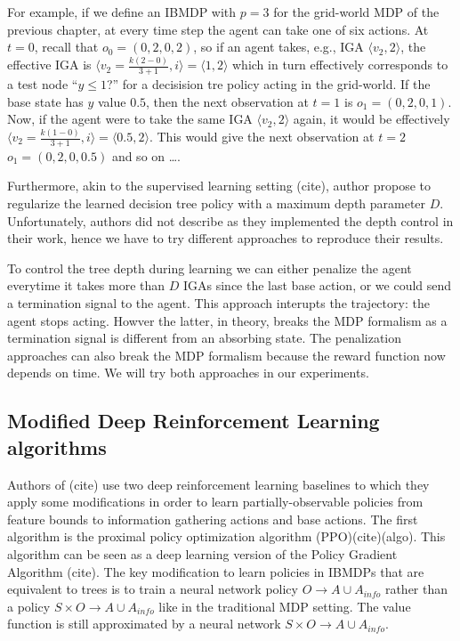 For example, if we define an IBMDP with $p=3$ for the grid-world MDP of the previous chapter, at every time step the agent can take one of six actions. 
At $t=0$, recall that $o_0=(0, 2, 0, 2)$, so if an agent takes, e.g., IGA $\langle v_2, 2 \rangle$, the effective IGA is $\langle v_2=\frac{k(2-0)}{3+1}, i \rangle = \langle 1, 2 \rangle$ which in turn effectively corresponds to a test node ``$y \leq 1$?'' for a decisision tre policy acting in the grid-world.
If the base state has $y$ value $0.5$, then the next observation at $t=1$ is $o_1=(0, 2, 0, 1)$. Now, if the agent were to take the same IGA $\langle v_2, 2 \rangle$ again, it would be effectively $\langle v_2=\frac{k(1-0)}{3+1}, i \rangle = \langle 0.5, 2 \rangle$. 
This would give the next observation at $t=2$ $o_1=(0, 2, 0, 0.5)$ and so on \dots. 

Furthermore, akin to the supervised learning setting (cite), author propose to regularize the learned decision tree policy with a maximum depth parameter $D$.
Unfortunately, authors did not describe as they implemented the depth control in their work, hence we have to try different approaches to reproduce their results.

To control the tree depth during learning we can either penalize the agent everytime it takes more than $D$ IGAs since the last base action, or we could send a termination signal to the agent. This approach interupts the trajectory: the agent stops acting. Howver the latter, in theory, breaks the MDP formalism as a termination signal is different from an absorbing state.
The penalization approaches can also break the MDP formalism because the reward function now depends on time. We will try both approaches in our experiments.


\subsection{Modified Deep Reinforcement Learning algorithms}
Authors of (cite) use two deep reinforcement learning baselines to which they apply some modifications in order to learn partially-observable policies from feature bounds to information gathering actions and base actions.
The first algorithm is the proximal policy optimization algorithm (PPO)(cite)(algo). This algorithm can be seen as a deep learning version of the Policy Gradient Algorithm (cite). 
The key modification to learn policies in IBMDPs that are equivalent to trees is to train a neural network policy $O\rightarrow A\cup A_{info}$ rather than a policy $S\times O\rightarrow A\cup A_{info}$ like in the traditional MDP setting.
The value function is still approximated by a neural network $S \times O \rightarrow A\cup A_{info}$.

